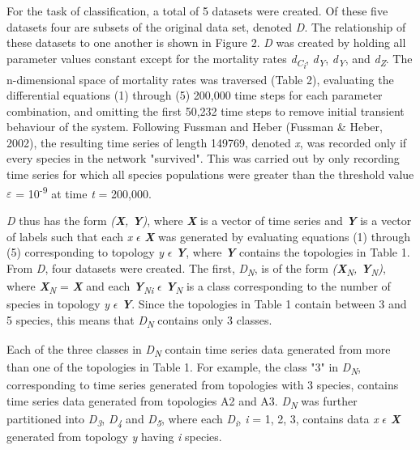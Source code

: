 \documentclass[letterpaper, 10 pt, conference]{ieeeconf}  %
\begin{document}
For the task of classification, a total of 5 datasets were created. Of these five datasets four are subsets of the original data set, denoted \textit{D}. The relationship of these datasets to one another is shown in Figure 2. \textit{D} was created by holding all parameter values constant except for the mortality rates \textit{d\textsubscript{C\textsubscript{i}}}, \textit{d\textsubscript{Y}}, \textit{d\textsubscript{Y}}, and \textit{d\textsubscript{Z}}. The n-dimensional space of mortality rates was traversed (Table 2), evaluating the differential equations (1) through (5) 200,000 time steps for each parameter combination, and omitting the first 50,232 time steps to remove initial transient behaviour of the system. Following Fussman and Heber (Fussman \& Heber, 2002), the resulting time series of length 149769, denoted \textit{x}, was recorded only if every species in the network "survived". This was carried out by only recording time series for which all species populations were greater than the threshold value $\varepsilon$ = 10\textsuperscript{-9} at time \textit{t} = 200,000. 

\textit{D} thus has the form \textit{(\textbf{X}, \textbf{Y})}, where \textit{\textbf{X}} is a vector of time series and \textit{\textbf{Y}} is a vector of labels such that each \textit{x} $\epsilon$ \textit{\textbf{X}} was generated by evaluating equations (1) through (5) corresponding to topology \textit{y} $\epsilon$ \textit{\textbf{Y}}, where \textit{\textbf{Y}} contains the topologies in Table 1. From \textit{D}, four datasets were created. The first, \textit{D\textsubscript{N}}, is of the form \textit{(\textbf{X}\textsubscript{N}, \textbf{Y}\textsubscript{N})}, where \textit{\textbf{X}\textsubscript{N}} = \textit{\textbf{X}} and each \textit{\textbf{Y}\textsubscript{Ni}} $\epsilon$ \textit{\textbf{Y}\textsubscript{N}} is a class corresponding to the number of species in topology \textit{y} $\epsilon$ \textit{\textbf{Y}}. Since the topologies in Table 1 contain between 3 and 5 species, this means that \textit{D\textsubscript{N}} contains only 3 classes. 

Each of the three classes in \textit{D\textsubscript{N}} contain time series data generated from more than one of the topologies in Table 1. For example, the class "3" in \textit{D\textsubscript{N}}, corresponding to time series generated from topologies with 3 species, contains time series data generated from topologies A2 and A3. \textit{D\textsubscript{N}} was further partitioned into \textit{D\textsubscript{3}}, \textit{D\textsubscript{4}} and \textit{D\textsubscript{5}}, where each \textit{D\textsubscript{i}}, \textit{i} = 1, 2, 3, contains data \textit{x} $\epsilon$ \textit{\textbf{X}} generated from topology \textit{y} having \textit{i} species. 
\end{document}
